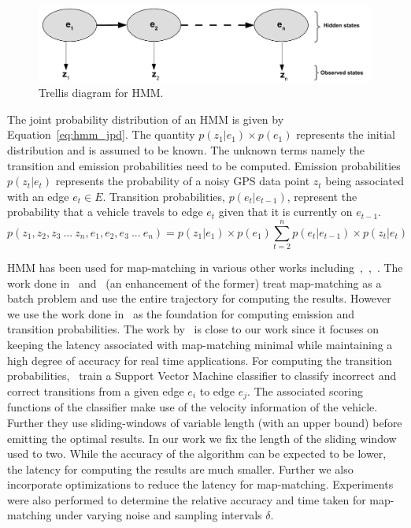 \documentclass{wscpaperproc}
\theoremstyle{wsc}
\begin{document}
\begin{figure}[h]
 \centering
 \includegraphics[scale=0.5]{hmm_trellis.pdf}
 \caption{Trellis diagram for HMM.}
 \label{fig:trellis}
\end{figure}



The joint probability distribution of an HMM is given by Equation~\ref{eq:hmm_jpd}. The quantity $p(z_{1}|e_{1})\times p(e_{1})$ represents the initial distribution and is assumed to be known. The unknown terms namely the transition and emission probabilities need to be computed. Emission probabilities $p(z_{t}|e_{t})$ represents the probability of a noisy GPS data point $z_{t}$ being associated with an edge $e_{t} \in E$. Transition probabilities, $p(e_{t}|e_{t-1})$, represent the probability that a vehicle travels to edge $e_{t}$ given that it is currently on $e_{t-1}$.
\begin{equation} \label{eq:hmm_jpd}
p(z_{1},z_{2},z_{3}~ ... ~z_{n}, e_{1},e_{2},e_{3}~ ... ~e_{n} ) = p(z_{1}|e_{1})\times p(e_{1})\sum_{t=2}^n p(e_{t}|e_{t-1})\times p(z_{t}|e_{t})
\end{equation}



HMM has been used for map-matching in various other works including~,~\cite{krumm2007map},~. The work done in~\cite{krumm2007map} and~ (an enhancement of the former) treat map-matching as a batch problem and use the entire trajectory for computing the results. However we use the work done in~\cite{newson2009hidden} as the foundation for computing emission and transition probabilities. The work by~ is close to our work since it focuses on keeping the latency associated with map-matching minimal while maintaining a high degree of accuracy for real time applications. For computing the transition probabilities,~ train a Support Vector Machine classifier to classify incorrect and correct transitions from a given edge $e_{i}$ to edge $e_{j}$. The associated scoring functions of the classifier make use of the velocity information of the vehicle. Further they use sliding-windows of variable length (with an upper bound) before emitting the optimal results. In our work we fix the length of the sliding window used to two. While the accuracy of the algorithm can be expected to be lower, the latency for computing the results are much smaller. Further we also incorporate optimizations to reduce the latency for map-matching. Experiments were also performed to determine  the relative accuracy and time taken for map-matching under varying noise and sampling intervals $\delta$.
\end{document}
